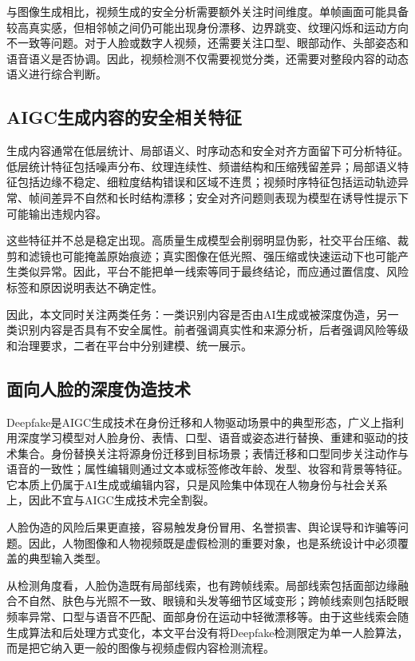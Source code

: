 与图像生成相比，视频生成的安全分析需要额外关注时间维度。单帧画面可能具备较高真实感，但相邻帧之间仍可能出现身份漂移、边界跳变、纹理闪烁和运动方向不一致等问题。对于人脸或数字人视频，还需要关注口型、眼部动作、头部姿态和语音语义是否协调。因此，视频检测不仅需要视觉分类，还需要对整段内容的动态语义进行综合判断。

\subsection{AIGC生成内容的安全相关特征}

生成内容通常在低层统计、局部语义、时序动态和安全对齐方面留下可分析特征。低层统计特征包括噪声分布、纹理连续性、频谱结构和压缩残留差异；局部语义特征包括边缘不稳定、细粒度结构错误和区域不连贯；视频时序特征包括运动轨迹异常、帧间差异不自然和长时结构漂移；安全对齐问题则表现为模型在诱导性提示下可能输出违规内容。

这些特征并不总是稳定出现。高质量生成模型会削弱明显伪影，社交平台压缩、裁剪和滤镜也可能掩盖原始痕迹；真实图像在低光照、强压缩或快速运动下也可能产生类似异常。因此，平台不能把单一线索等同于最终结论，而应通过置信度、风险标签和原因说明表达不确定性。

因此，本文同时关注两类任务：一类识别内容是否由AI生成或被深度伪造，另一类识别内容是否具有不安全属性。前者强调真实性和来源分析，后者强调风险等级和治理要求，二者在平台中分别建模、统一展示。

\subsection{面向人脸的深度伪造技术}

Deepfake是AIGC生成技术在身份迁移和人物驱动场景中的典型形态，广义上指利用深度学习模型对人脸身份、表情、口型、语音或姿态进行替换、重建和驱动的技术集合\cite{ref13,ref14,ref21,ref22}。身份替换关注将源身份迁移到目标场景；表情迁移和口型同步关注动作与语音的一致性；属性编辑则通过文本或标签修改年龄、发型、妆容和背景等特征。它本质上仍属于AI生成或编辑内容，只是风险集中体现在人物身份与社会关系上，因此不宜与AIGC生成技术完全割裂。

人脸伪造的风险后果更直接，容易触发身份冒用、名誉损害、舆论误导和诈骗等问题。因此，人物图像和人物视频既是虚假检测的重要对象，也是系统设计中必须覆盖的典型输入类型。

从检测角度看，人脸伪造既有局部线索，也有跨帧线索。局部线索包括面部边缘融合不自然、肤色与光照不一致、眼镜和头发等细节区域变形；跨帧线索则包括眨眼频率异常、口型与语音不匹配、面部身份在运动中轻微漂移等。由于这些线索会随生成算法和后处理方式变化，本文平台没有将Deepfake检测限定为单一人脸算法，而是把它纳入更一般的图像与视频虚假内容检测流程。

